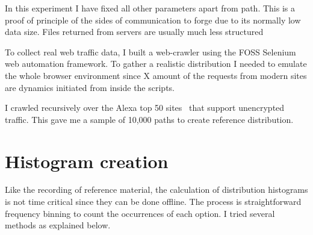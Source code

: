 \documentclass[ %
                    author={Samuel Russell},
                supervisor={Prof. Bogdan Warinschi},
                    degree={MEng},
                     title={Innocuous Ciphertexts},
                  subtitle={The DE-CENSOR Scheme},
                      type={research},
                      year={2018} ]{dissertation}
\begin{document}
In this experiment I have fixed all other parameters apart from path. This is a proof of principle
of the sides of communication to forge due to its normally low data size. Files returned from servers are usually much less structured 

To collect real web traffic data, I built a web-crawler using the FOSS Selenium web automation framework. To gather a realistic distribution I needed to emulate the whole browser environment since X amount of the requests from modern sites are dynamics initiated from inside the scripts.

I crawled recursively over the Alexa top 50 sites~\cite{alexa} that support unencrypted traffic. This gave me a sample of 10,000 paths to create reference distribution.

\section{Histogram creation}

Like the recording of reference material, the calculation of distribution histograms is not time critical since they can be done offline. The process is straightforward frequency binning to count the occurrences of each option. I tried several methods as explained below.
\end{document}
